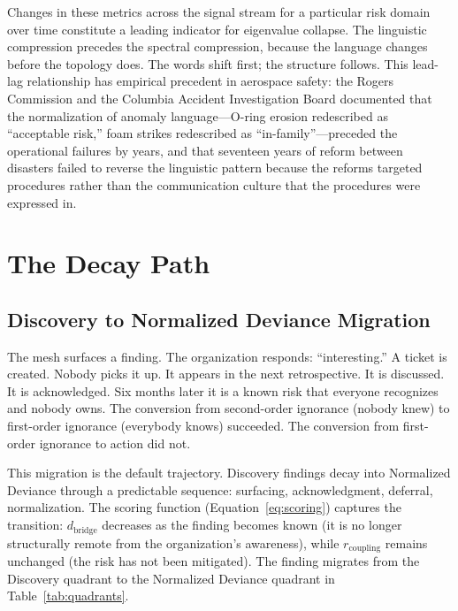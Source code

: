 \documentclass[11pt,a4paper]{article}
\begin{document}
Changes in these metrics across the signal stream for a particular risk domain over time constitute a leading indicator for eigenvalue collapse. The linguistic compression precedes the spectral compression, because the language changes before the topology does. The words shift first; the structure follows. This lead-lag relationship has empirical precedent in aerospace safety: the Rogers Commission \citep{rogers1986} and the Columbia Accident Investigation Board \citep{caib2003} documented that the normalization of anomaly language---O-ring erosion redescribed as ``acceptable risk,'' foam strikes redescribed as ``in-family''---preceded the operational failures by years, and that seventeen years of reform between disasters failed to reverse the linguistic pattern because the reforms targeted procedures rather than the communication culture that the procedures were expressed in.


\section{The Decay Path}
\label{sec:decay}

\subsection{Discovery to Normalized Deviance Migration}
\label{sec:migration}

The mesh surfaces a finding. The organization responds: ``interesting.'' A ticket is created. Nobody picks it up. It appears in the next retrospective. It is discussed. It is acknowledged. Six months later it is a known risk that everyone recognizes and nobody owns. The conversion from second-order ignorance (nobody knew) to first-order ignorance (everybody knows) succeeded. The conversion from first-order ignorance to action did not.

This migration is the default trajectory. Discovery findings decay into Normalized Deviance through a predictable sequence: surfacing, acknowledgment, deferral, normalization. The scoring function (Equation~\ref{eq:scoring}) captures the transition: $d_{\text{bridge}}$ decreases as the finding becomes known (it is no longer structurally remote from the organization's awareness), while $r_{\text{coupling}}$ remains unchanged (the risk has not been mitigated). The finding migrates from the Discovery quadrant to the Normalized Deviance quadrant in Table~\ref{tab:quadrants}.
\end{document}
